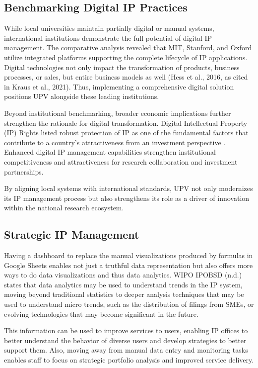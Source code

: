 \subsection{Benchmarking Digital IP Practices}

While local universities maintain partially digital or manual systems, international institutions demonstrate the full potential of digital IP management. The comparative analysis revealed that MIT, Stanford, and Oxford utilize integrated platforms supporting the complete lifecycle of IP applications. Digital technologies not only impact the transformation of products, business processes, or sales, but entire business models as well (Hess et al., 2016, as cited in Kraus et al., 2021). Thus, implementing a comprehensive digital solution positions UPV alongside these leading institutions.

Beyond institutional benchmarking, broader economic implications further strengthen the rationale for digital transformation. Digital Intellectual Property (IP) Rights listed robust protection of IP as one of the fundamental factors that contribute to a country's attractiveness from an investment perspective \citep{dco2024digitaliprights}. Enhanced digital IP management capabilities strengthen institutional competitiveness and attractiveness for research collaboration and investment partnerships.

By aligning local systems with international standards, UPV not only modernizes its IP management process but also strengthens its role as a driver of innovation within the national research ecosystem.

\subsection{Strategic IP Management}
Having a dashboard to replace the manual visualizations produced by formulas in Google Sheets enables not just a truthful data representation but also offers more ways to do data visualizations and thus data analytics. WIPO IPOBSD (n.d.) states that data analytics may be used to understand trends in the IP system, moving beyond traditional statistics to deeper analysis techniques that may be used to understand micro trends, such as the distribution of filings from SMEs, or evolving technologies that may become significant in the future.

This information can be used to improve services to users, enabling IP offices to better understand the behavior of diverse users and develop strategies to better support them. Also, moving away from manual data entry and monitoring tasks enables staff to focus on strategic portfolio analysis and improved service delivery.


